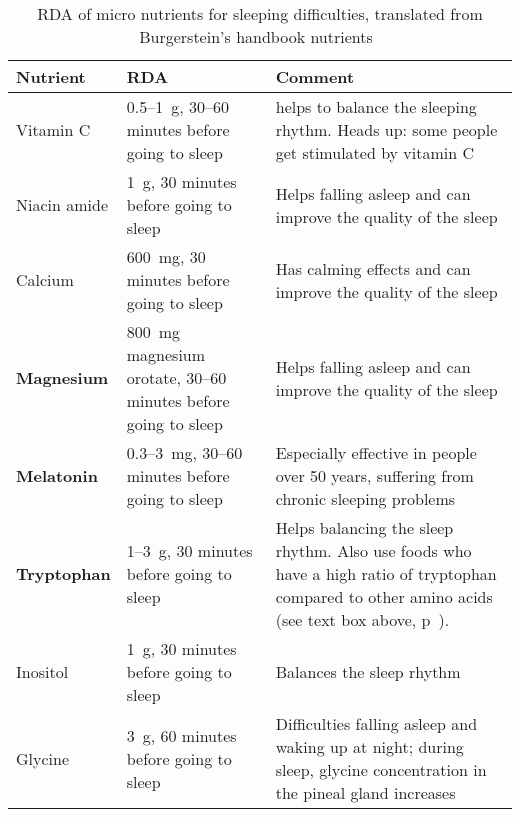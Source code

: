 \documentclass[../main.tex]{subfiles}
\begin{document}
  \begin{table}[htb!]
    \centering
    \begin{tabular}{p{2cm}p{4cm}p{5.5cm}}
      \textbf{Nutrient} &\textbf{RDA} & \textbf{Comment} \\
      \hline
      Vitamin C\index{vitamin!C} & 0.5--\SI{1}{\gram}, 30--60 minutes before going to sleep
                                      & helps to balance the sleeping rhythm. Heads up: some people get stimulated by vitamin C \\
      Niacin amide\index{micro nutrient!niacin amide} & \SI{1}{\gram}, 30 minutes before going to sleep & Helps falling asleep and can improve the quality of the sleep\\
      Calcium\index{micro nutrient!calcium} & \SI{600}{\milli\gram}, 30 minutes before going to sleep & Has calming effects  and can improve the quality of the sleep\\
      \textbf{Magnesium}\index{micro nutrient!magnesium}& \SI{800}{\milli\gram} magnesium orotate, 30--60 minutes before going to sleep  & Helps falling asleep and can improve the quality of the sleep\\
      \textbf{Melatonin}\index{micro nutrient!melatonin}& 0.3--\SI{3}{\milli\gram}, 30--60 minutes before going to sleep  & Especially effective in people over 50 years, suffering from chronic sleeping problems \\
       \textbf{Tryptophan}\index{micro nutrient!tryptophan}& 1--\SI{3}{\gram}, 30 minutes before going to sleep  & Helps balancing the sleep rhythm. Also use foods who have a high ratio of tryptophan compared to other amino acids (see text box above, p~\pageref{box:tryptophan}). \\
      Inositol\index{micro nutrient!inositol} & \SI{1}{\gram}, 30 minutes before going to sleep  & Balances the sleep rhythm \\
      Glycine\index{micro nutrient!glycine} & \SI{3}{\gram}, 60 minutes before going to sleep  & Difficulties falling asleep and waking up at night; during sleep, glycine concentration in the pineal gland increases \\
    \end{tabular}
    \caption[RDA of micro nutrients in for sleeping difficulties]
    {RDA of micro nutrients for sleeping difficulties, translated from  Burgerstein's handbook nutrients~\cite{BurgerNutrient}}
  \end{table}
\end{document}
